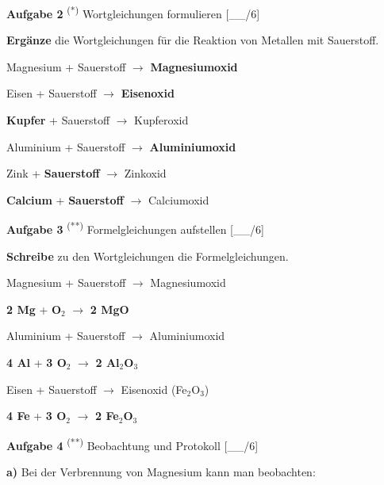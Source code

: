\documentclass[11pt, a4paper]{article}
\newif\ifzeigesternchen\zeigesternchentrue
\newcommand{\lsg}[1]{\textcolor{loesung}{\textbf{#1}}}  %
\newcommand{\punktebox}[1]{\hfill\small\textcolor{mittelgrau}{[\_\_/#1]}}
\newcommand{\stern}[1]{%
    \ifzeigesternchen%
        \textsuperscript{\textcolor{fachfarbe}{(#1)}}%
    \fi%
}
\newcommand{\aufgabe}[2]{%
    \needspace{4\baselineskip}%
    \vspace{10pt}%
    \noindent\textbf{\textcolor{fachfarbe}{Aufgabe #1}} #2%
    \vspace{4pt}%
    \nopagebreak[4]%
}
\newcommand{\operator}[1]{\textbf{\textcolor{fachfarbe}{#1}}}
\begin{document}

\aufgabe{2}{\stern{*} Wortgleichungen formulieren} \punktebox{6}

\operator{Ergänze} die Wortgleichungen für die Reaktion von Metallen mit Sauerstoff.

\begin{teil}
    \item Magnesium + Sauerstoff $\longrightarrow$ \lsg{Magnesiumoxid}
    \item Eisen + Sauerstoff $\longrightarrow$ \lsg{Eisenoxid}
    \item \lsg{Kupfer} + Sauerstoff $\longrightarrow$ Kupferoxid
    \item Aluminium + Sauerstoff $\longrightarrow$ \lsg{Aluminiumoxid}
    \item Zink + \lsg{Sauerstoff} $\longrightarrow$ Zinkoxid
    \item \lsg{Calcium} + \lsg{Sauerstoff} $\longrightarrow$ Calciumoxid
\end{teil}


\aufgabe{3}{\stern{**} Formelgleichungen aufstellen} \punktebox{6}

\operator{Schreibe} zu den Wortgleichungen die Formelgleichungen.

\begin{teil}
    \item Magnesium + Sauerstoff $\longrightarrow$ Magnesiumoxid

    \vspace{0.3em}
    \lsg{2 Mg} + \lsg{O$_2$} $\longrightarrow$ \lsg{2 MgO}

    \item Aluminium + Sauerstoff $\longrightarrow$ Aluminiumoxid

    \vspace{0.3em}
    \lsg{4 Al} + \lsg{3 O$_2$} $\longrightarrow$ \lsg{2 Al$_2$O$_3$}

    \item Eisen + Sauerstoff $\longrightarrow$ Eisenoxid (Fe$_2$O$_3$)

    \vspace{0.3em}
    \lsg{4 Fe} + \lsg{3 O$_2$} $\longrightarrow$ \lsg{2 Fe$_2$O$_3$}
\end{teil}


\newpage

\aufgabe{4}{\stern{**} Beobachtung und Protokoll} \punktebox{6}

\textbf{a)} Bei der Verbrennung von Magnesium kann man beobachten:
\end{document}
